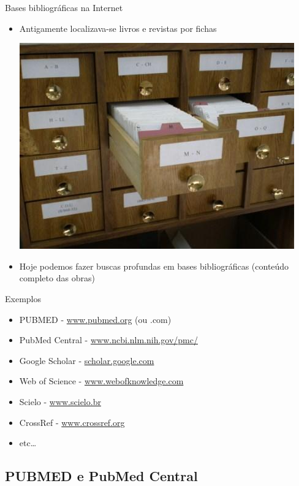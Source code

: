 \documentclass{beamer}
\begin{document}
\begin{frame}{Bases bibliográficas na Internet}
  \begin{itemize}
  \item Antigamente localizava-se livros e revistas por fichas
    \begin{center}
      \includegraphics[height=.45\textheight]{Busca/fichas}
    \end{center}

  \item Hoje podemos fazer buscas profundas em bases bibliográficas
    (conteúdo completo das obras)
  \end{itemize}
\end{frame}

\begin{frame}{Exemplos}
  \begin{itemize}
  \item \alert{PUBMED} - \url{www.pubmed.org} (ou .com)
  \item \alert{PubMed Central} - \url{www.ncbi.nlm.nih.gov/pmc/}
  \item \alert{Google Scholar} - \url{scholar.google.com}
  \item Web of Science - \url{www.webofknowledge.com}
  \item Scielo - \url{www.scielo.br}
  \item CrossRef - \url{www.crossref.org}
  \item etc\ldots
  \end{itemize}
\end{frame}

\subsection{PUBMED e PubMed Central}
\end{document}
